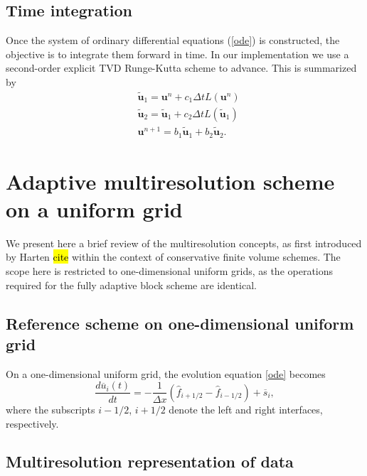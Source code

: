 \documentclass[]{article}
\begin{document}
    \subsection{Time integration}

        Once the system of ordinary differential equations (\ref{ode}) is
        constructed, the objective is to integrate them forward in time. In our
        implementation we use a second-order explicit TVD Runge-Kutta scheme to
        advance. This is summarized by
        \begin{align}
            & \tilde{\bm{u}}_{1} = \bm{u}^{n} + c_{1} \Delta t L(\bm{u}^{n}) \\
            & \tilde{\bm{u}}_{2} = \tilde{\bm{u}}_{1} + c_{2} \Delta t L(\tilde{\bm{u}}_{1}) \\
            & \bm{u}^{n+1} = b_{1} \tilde{\bm{u}}_{1} + b_{2} \tilde{\bm{u}}_{2}.
        \end{align}

\section{Adaptive multiresolution scheme on a uniform grid}

    We present here a brief review of the multiresolution concepts, as first
    introduced by Harten \hl{cite} within the context of conservative finite
    volume schemes. The scope here is restricted to one-dimensional uniform
    grids, as the operations required for the fully adaptive block scheme are
    identical.

    \subsection{Reference scheme on one-dimensional uniform grid}

        On a one-dimensional uniform grid, the evolution equation \ref{ode} becomes
        \begin{equation}
            \frac{d \overline{u}_{i}(t)}{dt} = -\frac{1}{\Delta x} \left( \hat{f}_{i+1/2} -
            \hat{f}_{i-1/2} \right) + \overline{s}_{i},
        \end{equation}
        where the subscripts $i-1/2$, $i+1/2$ denote the left and right interfaces, respectively.

        \subsection{Multiresolution representation of data}
\end{document}
